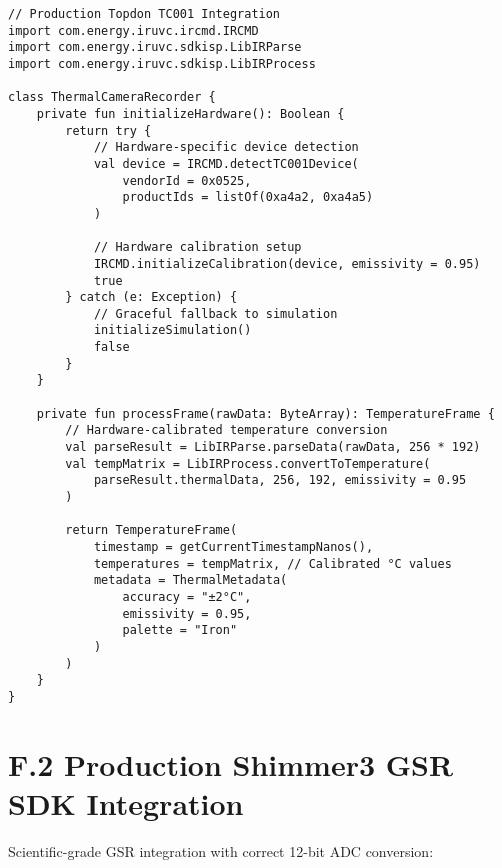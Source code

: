 \begin{verbatim}
// Production Topdon TC001 Integration
import com.energy.iruvc.ircmd.IRCMD
import com.energy.iruvc.sdkisp.LibIRParse
import com.energy.iruvc.sdkisp.LibIRProcess

class ThermalCameraRecorder {
    private fun initializeHardware(): Boolean {
        return try {
            // Hardware-specific device detection
            val device = IRCMD.detectTC001Device(
                vendorId = 0x0525,
                productIds = listOf(0xa4a2, 0xa4a5)
            )

            // Hardware calibration setup
            IRCMD.initializeCalibration(device, emissivity = 0.95)
            true
        } catch (e: Exception) {
            // Graceful fallback to simulation
            initializeSimulation()
            false
        }
    }

    private fun processFrame(rawData: ByteArray): TemperatureFrame {
        // Hardware-calibrated temperature conversion
        val parseResult = LibIRParse.parseData(rawData, 256 * 192)
        val tempMatrix = LibIRProcess.convertToTemperature(
            parseResult.thermalData, 256, 192, emissivity = 0.95
        )

        return TemperatureFrame(
            timestamp = getCurrentTimestampNanos(),
            temperatures = tempMatrix, // Calibrated °C values
            metadata = ThermalMetadata(
                accuracy = "±2°C",
                emissivity = 0.95,
                palette = "Iron"
            )
        )
    }
}
\end{verbatim}

\section{F.2 Production Shimmer3 GSR SDK Integration}

Scientific-grade GSR integration with correct 12-bit ADC conversion:

